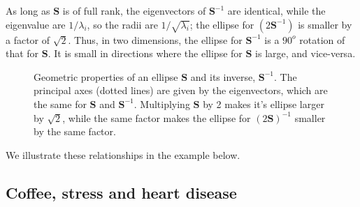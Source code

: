 \documentclass[
  letterpaper,
  10pt,
  krantz2]{krantz}
\begin{document}
As long as \(\mathbf{S}\) is of full rank, the eigenvectors of
\(\mathbf{S}^{-1}\) are identical, while the eigenvalue are
\(1 / \lambda_i\), so the radii are \(1 / \sqrt{\lambda_i}\); the
ellipse for \((2 \mathbf{S}^{-1})\) is smaller by a factor of
\(\sqrt{2}\). Thus, in two dimensions, the ellipse for
\(\mathbf{S}^{-1}\) is a \(90^o\) rotation of that for \(\mathbf{S}\).
It is small in directions where the ellipse for \(\mathbf{S}\) is large,
and vice-versa.

\begin{figure}


\caption{\label{fig-inverse}Geometric properties of an ellipse
\(\mathbf{S}\) and its inverse, \(\mathbf{S}^{-1}\). The principal axes
(dotted lines) are given by the eigenvectors, which are the same for
\(\mathbf{S}\) and \(\mathbf{S}^{-1}\). Multiplying \(\mathbf{S}\) by 2
makes it's ellipse larger by \(\sqrt{2}\), while the same factor makes
the ellipse for \((2 \mathbf{S})^{-1}\) smaller by the same factor.}

\end{figure}%

We illustrate these relationships in the example below.

\subsection{Coffee, stress and heart
disease}\label{coffee-stress-and-heart-disease}
\end{document}
